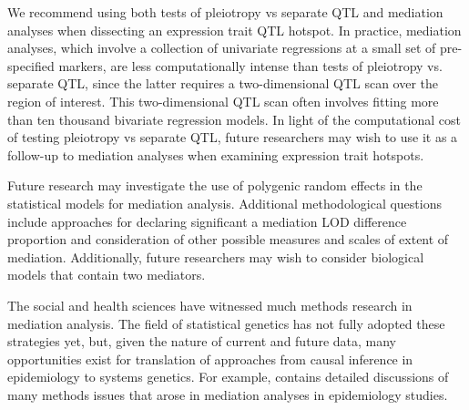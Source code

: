 \documentclass[oneside]{book}
\begin{document}
We recommend using both tests of pleiotropy vs separate QTL and mediation analyses when dissecting an expression trait QTL hotspot. In practice, mediation analyses, which involve a collection of univariate regressions at a small set of pre-specified markers, are less computationally intense than tests of pleiotropy vs. separate QTL, since the latter requires a two-dimensional QTL scan over the region of interest. This two-dimensional QTL scan often involves fitting more than ten thousand bivariate regression models. In light of the computational cost of testing pleiotropy vs separate QTL, future researchers may wish to use it as a follow-up to mediation analyses when examining expression trait hotspots.

Future research may investigate the use of polygenic random effects in the statistical models for mediation analysis. Additional methodological questions include approaches for declaring significant a mediation LOD difference proportion and consideration of other possible measures and scales of extent of mediation. Additionally, future researchers may wish to consider biological models that contain two mediators.

The social and health sciences have witnessed much methods research in mediation analysis. The field of statistical genetics has not fully adopted these strategies yet, but, given the nature of current and future data, many opportunities exist for translation of approaches from causal inference in epidemiology to systems genetics. For example, \citet{vanderweele2015explanation} contains detailed discussions of many methods issues that arose in mediation analyses in epidemiology studies.
\end{document}
